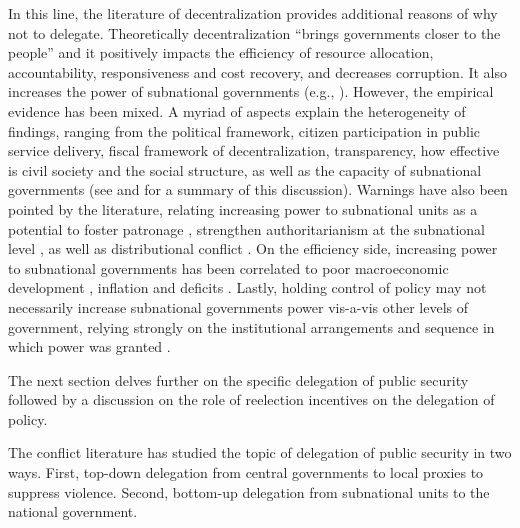 \documentclass[12pt]{amsart}
\makeatletter
\def\subsection{\@startsection{subsection}{2}
	\z@{.8\linespacing\@plus.7\linespacing}{.7\linespacing}{\large}}
\numberwithin{equation}{section}
\theoremstyle{definition}
\theoremstyle{definition}
\theoremstyle{definition}
\makeatother
\begin{document}
 In this line, the literature of decentralization provides additional reasons of why not to delegate. Theoretically decentralization ``brings governments closer to the people'' and it positively impacts the efficiency of resource allocation, accountability, responsiveness and cost recovery, and decreases corruption. It also increases the power of subnational governments (e.g., \citet{diamond_1999}). However, the empirical evidence has been mixed. A myriad of aspects explain the heterogeneity of findings, ranging from the political framework, citizen participation in public service delivery, fiscal framework of decentralization, transparency, how effective is civil society and the social structure, as well as the capacity of subnational governments (see \citet{azfar_etal_1999} and \citet{falleti_2005} for a summary of this discussion). Warnings have also been pointed by the literature, relating increasing power to subnational units as a potential to foster patronage \citep{samuels_2003}, strengthen authoritarianism at the subnational level \citep{cornelius_1999}, as well as distributional conflict \citep{treisman_1999}. On the efficiency side, increasing power to subnational governments has been correlated to poor macroeconomic development \citep{wibbels_2000}, inflation\citep{treisman_2000b} and deficits \citep{rodden_2002}. Lastly, holding control of policy may not necessarily increase subnational governments power vis-a-vis other levels of government, relying strongly on the institutional arrangements and sequence in which power was granted \citep{falleti_2005}.  
         
 The next section delves further on the specific delegation of public security followed by a discussion on the role of reelection incentives on the delegation of policy.

     
\subsection{Delegation of Security Policy}%

The conflict literature has studied the topic of delegation of public security in two ways. First, top-down delegation from central governments to local proxies to suppress violence. Second, bottom-up delegation from subnational units to the national government. 
\end{document}
